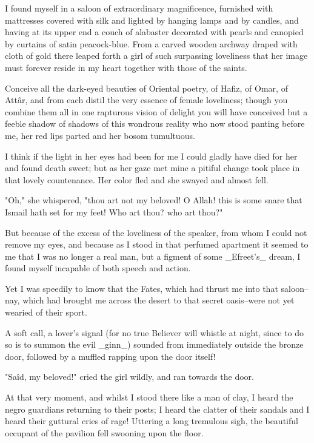 I found myself in a saloon of extraordinary magnificence, furnished
with mattresses covered with silk and lighted by hanging lamps and by
candles, and having at its upper end a couch of alabaster decorated
with pearls and canopied by curtains of satin peacock-blue. From a
carved wooden archway draped with cloth of gold there leaped forth a
girl of such surpassing loveliness that her image must forever reside
in my heart together with those of the saints.

Conceive all the dark-eyed beauties of Oriental poetry, of Hafiz, of
Omar, of Attâr, and from each distil the very essence of female
loveliness; though you combine them all in one rapturous vision of
delight you will have conceived but a feeble shadow of shadows of this
wondrous reality who now stood panting before me, her red lips parted
and her bosom tumultuous.

I think if the light in her eyes had been for me I could gladly have
died for her and found death sweet; but as her gaze met mine a
pitiful change took place in that lovely countenance. Her color fled
and she swayed and almost fell.

"Oh," she whispered, "thou art not my beloved! O Allah! this is some
snare that Ismail hath set for my feet! Who art thou? who art thou?"

But because of the excess of the loveliness of the speaker, from whom
I could not remove my eyes, and because as I stood in that perfumed
apartment it seemed to me that I was no longer a real man, but a
figment of some _Efreet's_ dream, I found myself incapable of both
speech and action.

Yet I was speedily to know that the Fates, which had thrust me into
that saloon--nay, which had brought me across the desert to that
secret oasis--were not yet wearied of their sport.

A soft call, a lover's signal (for no true Believer will whistle at
night, since to do so is to summon the evil _ginn_) sounded from
immediately outside the bronze door, followed by a muffled rapping
upon the door itself!

"Saîd, my beloved!" cried the girl wildly, and ran towards the door.

At that very moment, and whilst I stood there like a man of clay,
I heard the negro guardians returning to their posts; I heard the
clatter of their sandals and I heard their guttural cries of rage!
Uttering a long tremulous sigh, the beautiful occupant of the pavilion
fell swooning upon the floor.

